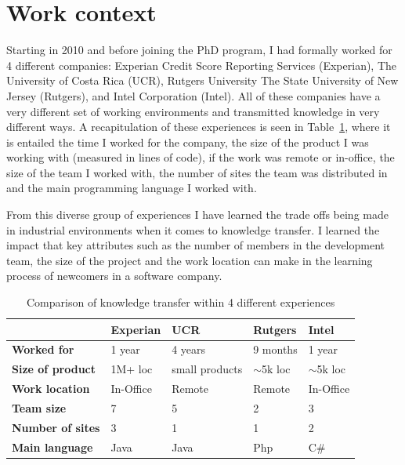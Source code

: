 \documentclass[12pt, letterpaper]{article}
\begin{document}
 


 
\section{Work context}
Starting in 2010 and before joining the PhD program, I had formally worked for 4 different companies: Experian Credit 
Score Reporting Services (Experian), The University of Costa Rica (UCR), Rutgers University The State University of New 
Jersey (Rutgers), and Intel Corporation (Intel). All of these companies 
have a very different set of working environments and transmitted knowledge in very different ways. A recapitulation of
these experiences is seen in Table~\ref{comparisonTable}, where it is entailed the time I worked for the company, the 
size of the product I was working with (measured in lines of code), if the work was remote or in-office, the size of the 
team I worked with, the number of sites the team was distributed in and the main programming language I worked with.

From this diverse group of experiences I have learned the trade offs being made in industrial environments
when it comes to knowledge transfer. I learned the impact that key attributes such as the number of members in the 
development team, the size of the project and the work location can make in the learning process of newcomers in a
software company. 

\begin{table}[] 
\centering
\caption{Comparison of knowledge transfer within 4 different experiences}
\label{comparisonTable}
\begin{tabular}{|l|l|l|l|l|}
\hline
                         & \textbf{Experian} & \textbf{UCR}   & \textbf{Rutgers} & \textbf{Intel} \\ \hline
\textbf{Worked for}      & 1 year            & 4 years        & 9 months         & 1 year         \\ \hline
\textbf{Size of product} & 1M+ loc           & small products & $\sim$5k loc     & $\sim$5k loc   \\ \hline
\textbf{Work location}   & In-Office         & Remote         & Remote           & In-Office      \\ \hline
\textbf{Team size}       & 7                 & 5              & 2                & 3              \\ \hline
\textbf{Number of sites} & 3                 & 1              & 1                & 2              \\ \hline
\textbf{Main language}   & Java              & Java           & Php              & C\#            \\ \hline
\end{tabular}
\end{table}
\end{document}
